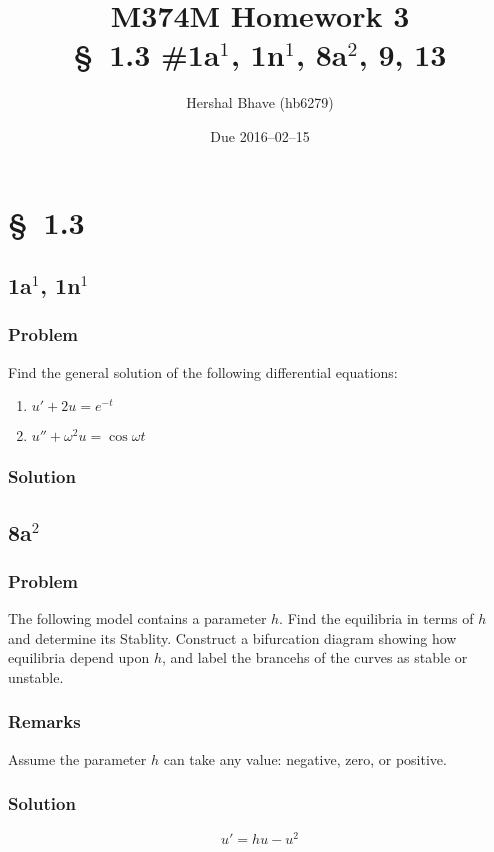 \documentclass[12pt]{article}
\title{M374M Homework 3 \\
  \normalsize{\S~1.3 \#1a$^1$, 1n$^1$, 8a$^2$, 9, 13}}
\author{Hershal Bhave (hb6279)}
\date{Due 2016--02--15}
\begin{document}
\maketitle

\section{\S~1.3}
\subsection{1a$^1$, 1n$^1$}
\subsubsection*{Problem}
Find the general solution of the following differential equations:
\begin{enumerate}
\item $u'+2u=e^{-t}$
\item $u''+\omega^2u=\cos\omega t$
\end{enumerate}

\subsubsection*{Solution}
\todo[]

\subsection{8a$^2$}
\subsubsection*{Problem}
The following model contains a parameter $h$. Find the equilibria in terms of
$h$ and determine its Stablity. Construct a bifurcation diagram showing how
equilibria depend upon $h$, and label the brancehs of the curves as stable or
unstable.

\subsubsection*{Remarks}
Assume the parameter $h$ can take any value: negative, zero, or positive.

\subsubsection*{Solution}
\todo[]

\begin{equation}
  \label{eq:8a-problem}
  u'=hu-u^2
\end{equation}
\end{document}
